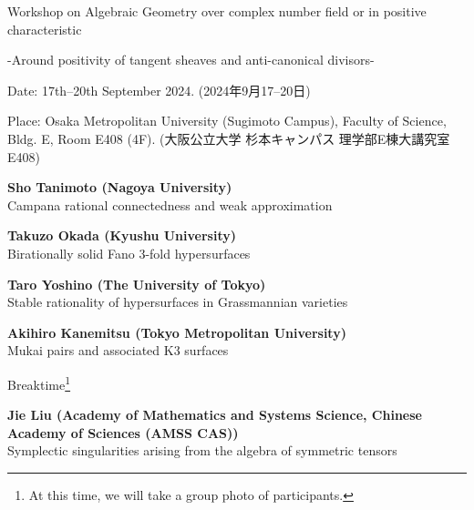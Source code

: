 \documentclass[dvipdfmx,a4paper,12pt]{article}
\theoremstyle{plain} %
\theoremstyle{definition} %
\begin{document}
\begin{center}
  {\LARGE Workshop on Algebraic Geometry over complex number field or in positive characteristic}
 
  {\large -Around positivity of tangent sheaves and anti-canonical divisors-}
  \end{center}
  
\vskip5mm
\begin{flushleft}
{ Date: 17th--20th September 2024. (2024年9月17--20日)}


{Place: Osaka Metropolitan University (Sugimoto Campus), Faculty of Science, Bldg. E, Room E408 (4F). }
{(大阪公立大学 杉本キャンパス 理学部E棟大講究室 E408)}

\end{flushleft}




\vskip8mm
\vskip3mm

\vskip1mm
{\bf Sho Tanimoto (Nagoya University)}\\
 Campana rational connectedness and weak approximation
\vskip3mm

{\bf Takuzo Okada (Kyushu University)}\\
Birationally solid Fano 3-fold hypersurfaces
\vskip3mm

{\bf Taro Yoshino (The University of Tokyo)}\\
Stable rationality of hypersurfaces in Grassmannian varieties
\vskip5mm


\vskip1mm
{\bf Akihiro Kanemitsu (Tokyo Metropolitan University)}\\
Mukai pairs and associated K3 surfaces
\vskip3mm

 Breaktime\footnote{At this time, we will take a group photo of participants.}
\vskip3mm

{\bf Jie Liu (Academy of Mathematics and Systems Science, Chinese Academy of Sciences (AMSS CAS))}\\
Symplectic singularities arising from the algebra of symmetric tensors
\vskip3mm
\end{document}
